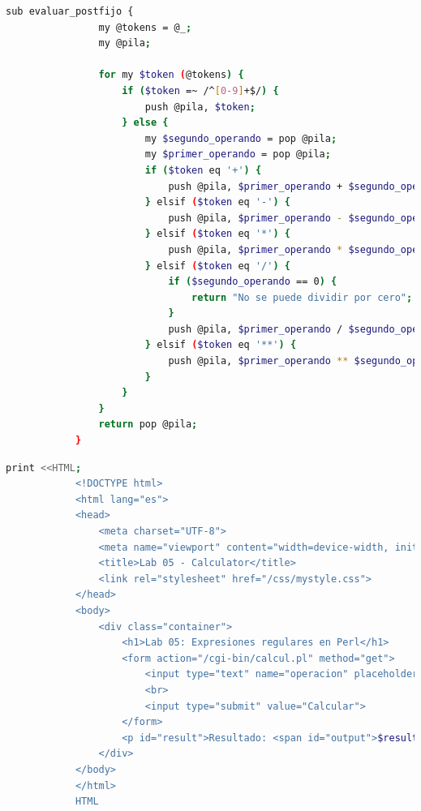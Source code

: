 \documentclass{article}
\begin{document}
        \begin{lstlisting}[language=bash,caption={Aquí se evalúan los tokens de la expresión en notación postfija, utilizando una expresión regular para identificar números, lo que permite manipular la pila y realizar las operaciones.}, label={lst:color-boton}]
            sub evaluar_postfijo {
                my @tokens = @_;
                my @pila;
            
                for my $token (@tokens) {
                    if ($token =~ /^[0-9]+$/) {
                        push @pila, $token;
                    } else {
                        my $segundo_operando = pop @pila;
                        my $primer_operando = pop @pila;
                        if ($token eq '+') {
                            push @pila, $primer_operando + $segundo_operando;
                        } elsif ($token eq '-') {
                            push @pila, $primer_operando - $segundo_operando;
                        } elsif ($token eq '*') {
                            push @pila, $primer_operando * $segundo_operando;
                        } elsif ($token eq '/') {
                            if ($segundo_operando == 0) {
                                return "No se puede dividir por cero";
                            }
                            push @pila, $primer_operando / $segundo_operando;
                        } elsif ($token eq '**') {
                            push @pila, $primer_operando ** $segundo_operando;
                        }
                    }
                }
                return pop @pila;
            }

        \end{lstlisting}

        \begin{lstlisting}[language=bash,caption={Por ultimo en este fragmento finaliza el script, generando la estructura HTML de la calculadora con el resultado. Es fundamental en CGI para mostrar el resultado de la operación ingresada.}, label={lst:color-boton}]
            print <<HTML;
            <!DOCTYPE html>
            <html lang="es">
            <head>
                <meta charset="UTF-8">
                <meta name="viewport" content="width=device-width, initial-scale=1.0">
                <title>Lab 05 - Calculator</title>
                <link rel="stylesheet" href="/css/mystyle.css">
            </head>
            <body>
                <div class="container">
                    <h1>Lab 05: Expresiones regulares en Perl</h1>
                    <form action="/cgi-bin/calcul.pl" method="get">
                        <input type="text" name="operacion" placeholder="operacion" required>
                        <br>
                        <input type="submit" value="Calcular">
                    </form>
                    <p id="result">Resultado: <span id="output">$resultado_final</span></p>
                </div>
            </body>
            </html>
            HTML

        \end{lstlisting}
\end{document}
